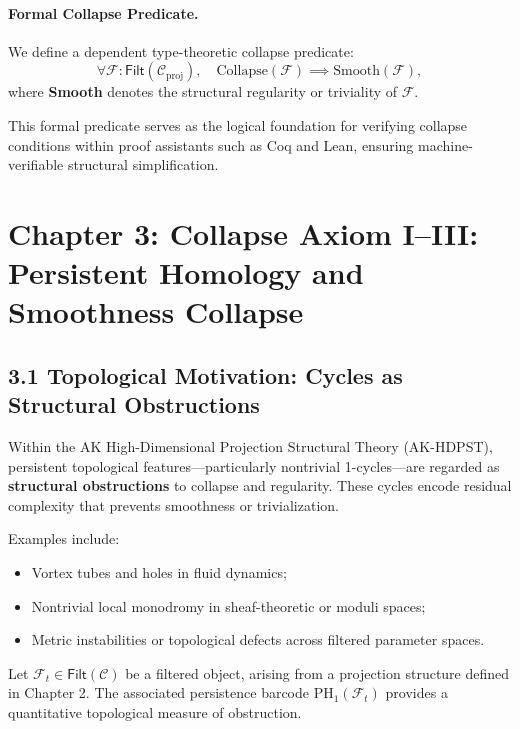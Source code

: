 \documentclass[11pt]{article}
\begin{document}
\paragraph{Formal Collapse Predicate.}  
We define a dependent type-theoretic collapse predicate:
\[
\forall \mathcal{F} : \mathsf{Filt}(\mathcal{C}_{\mathrm{proj}}), \quad \mathrm{Collapse}(\mathcal{F}) \implies \mathrm{Smooth}(\mathcal{F}),
\]
where \textbf{Smooth} denotes the structural regularity or triviality of \( \mathcal{F} \).

This formal predicate serves as the logical foundation for verifying collapse conditions within proof assistants such as Coq and Lean, ensuring machine-verifiable structural simplification.



\section{Chapter 3: Collapse Axiom I–III: Persistent Homology and Smoothness Collapse}

\subsection*{3.1 Topological Motivation: Cycles as Structural Obstructions}

Within the AK High-Dimensional Projection Structural Theory (AK-HDPST), persistent topological features—particularly nontrivial 1-cycles—are regarded as \textbf{structural obstructions} to collapse and regularity. These cycles encode residual complexity that prevents smoothness or trivialization.

Examples include:

\begin{itemize}
    \item Vortex tubes and holes in fluid dynamics;
    \item Nontrivial local monodromy in sheaf-theoretic or moduli spaces;
    \item Metric instabilities or topological defects across filtered parameter spaces.
\end{itemize}

Let \( \mathcal{F}_t \in \mathsf{Filt}(\mathcal{C}) \) be a filtered object, arising from a projection structure defined in Chapter 2. The associated persistence barcode \( \mathrm{PH}_1(\mathcal{F}_t) \) provides a quantitative topological measure of obstruction.
\end{document}
